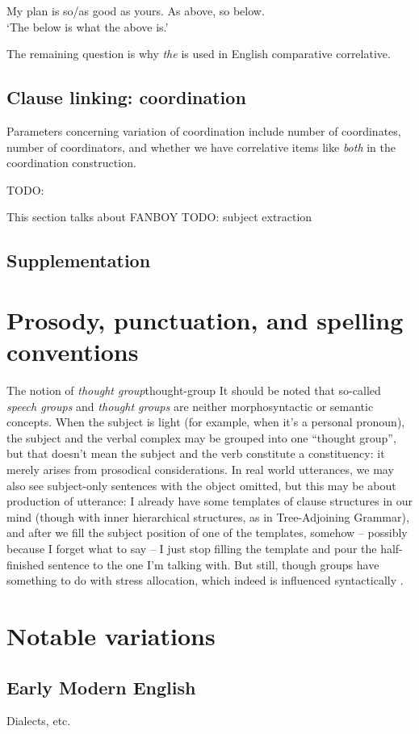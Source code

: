 \documentclass[UTF8, a4paper, oneside, scheme=plain, 12pt]{ctexbook}
\newcommand*{\citepage}[1]{p.~{#1}}
\newcommand*{\term}[1]{\emph{#1}}
\newcommand{\form}[1]{\emph{#1}}
\newcommand{\translate}[1]{`#1'}
\begin{document}
\begin{exe}
    \ex My plan is so/as good as yours. 
    \ex As above, so below. \\ 
    \translate{The below is what the above is.} 
    \ex 
\end{exe}

The remaining question is why \form{the} is used in English comparative correlative.

\section{Clause linking: coordination}\label{sec:clause-linking.coordination}

Parameters concerning variation of coordination 
include number of coordinates, 
number of coordinators,
and whether we have correlative items like \form{both} in the coordination construction.

TODO: \citet[\citepage{1276}]{cgel}

This section talks about FANBOY
TODO: subject extraction

\section{Supplementation}\label{sec:clause-linking.supplementation}


\chapter{Prosody, punctuation, and spelling conventions}

\begin{infobox}{The notion of \term{thought group}}{thought-group}
    It should be noted that so-called \term{speech groups}
    and \term{thought groups}
    are neither morphosyntactic or semantic concepts.
    When the subject is light (for example, when it's a personal pronoun),
    the subject and the verbal complex may be grouped into one ``thought group'',
    but that doesn't mean the subject and the verb constitute a constituency:
    it merely arises from prosodical considerations.
    In real world utterances, 
    we may also see subject-only sentences with the object omitted,
    but this may be about production of utterance:
    I already have some templates of clause structures in our mind
    (though with inner hierarchical structures, as in Tree-Adjoining Grammar),
    and after we fill the subject position of one of the templates,
    somehow -- possibly because I forget what to say -- 
    I just stop filling the template and pour the half-finished sentence 
    to the one I'm talking with.
    But still, though groups have something to do with stress allocation,
    which indeed is influenced syntactically \citep[\citepage{7}]{kahnemuyipour2009syntax}. 
\end{infobox}

\chapter{Notable variations}

\section{Early Modern English}

Dialects, etc.




\end{document}
